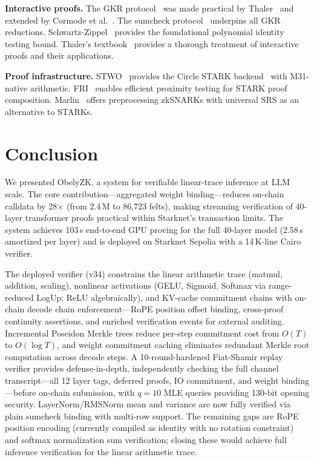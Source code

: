 \documentclass[10pt,twocolumn]{article}
\theoremstyle{definition}
\theoremstyle{remark}
\begin{document}
\textbf{Interactive proofs.}
The GKR protocol~\cite{goldwasser2015delegating} was made practical
by Thaler~\cite{thaler2013time} and extended by Cormode et
al.~\cite{cormode2012practical}.
The sumcheck protocol~\cite{lund1992algebraic} underpins all GKR
reductions.
Schwartz-Zippel~\cite{schwartz1980, zippel1979} provides the
foundational polynomial identity testing bound.
Thaler's textbook~\cite{thaler2022proofs} provides a thorough treatment
of interactive proofs and their applications.

\textbf{Proof infrastructure.}
STWO~\cite{starkware2024stwo} provides the Circle STARK
backend~\cite{habock2024circle} with M31-native arithmetic.
FRI~\cite{ben-sasson2018fri} enables efficient proximity testing
for STARK proof composition.
Marlin~\cite{chiesa2020marlin} offers preprocessing zkSNARKs with
universal SRS as an alternative to STARKs.


\section{Conclusion}\label{sec:conclusion}

We presented ObelyZK, a system for verifiable linear-trace inference
at LLM scale.
The core contribution---aggregated weight binding---reduces on-chain
calldata by 28$\times$ (from 2.4\,M to 86{,}723 felts), making
streaming verification of 40-layer transformer proofs practical within
Starknet's transaction limits.
The system achieves 103\,s end-to-end GPU proving for the full 40-layer
model (2.58\,s amortized per layer) and is deployed on
Starknet Sepolia with a 14\,K-line Cairo verifier.

The deployed verifier (v34) constrains the linear arithmetic trace
(matmul, addition, scaling), nonlinear activations (GELU,
Sigmoid, Softmax via range-reduced LogUp; ReLU algebraically),
and KV-cache commitment chains with on-chain decode chain
enforcement---RoPE position offset binding, cross-proof continuity
assertions, and enriched verification events for external auditing.
Incremental Poseidon Merkle trees reduce per-step commitment cost
from $O(T)$ to $O(\log T)$, and weight commitment caching
eliminates redundant Merkle root computation across decode steps.
A 10-round-hardened Fiat-Shamir replay verifier provides
defense-in-depth, independently checking the full channel
transcript---all 12 layer tags, deferred proofs, IO commitment,
and weight binding---before on-chain submission, with $q\!=\!10$
MLE queries providing 130-bit opening security.
LayerNorm/RMSNorm mean and variance are now fully verified via
plain sumcheck binding with multi-row support.
The remaining gaps are RoPE position encoding (currently compiled
as identity with no rotation constraint) and softmax normalization
sum verification; closing these would achieve full inference
verification for the linear arithmetic trace.
\end{document}
